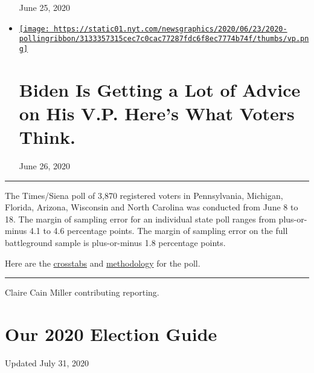 \begin{itemize}
  June 25, 2020
\item
  \href{https://www.nytimes.com/2020/06/26/us/politics/biden-vice-president-voters.html}{\texttt{[image: https://static01.nyt.com/newsgraphics/2020/06/23/2020-pollingribbon/3133357315cec7c0cac77287fdc6f8ec7774b74f/thumbs/vp.png]}}

  \href{https://www.nytimes.com/2020/06/26/us/politics/biden-vice-president-voters.html}{}

  \hypertarget{biden-is-getting-a-lot-of-advice-on-his-vp-heres-what-voters-think}{%
  \section{Biden Is Getting a Lot of Advice on His V.P. Here's What
  Voters
  Think.}\label{biden-is-getting-a-lot-of-advice-on-his-vp-heres-what-voters-think}}

  June 26, 2020
\end{itemize}

\begin{center}\rule{0.5\linewidth}{\linethickness}\end{center}

The Times/Siena poll of 3,870 registered voters in Pennsylvania,
Michigan, Florida, Arizona, Wisconsin and North Carolina was conducted
from June 8 to 18. The margin of sampling error for an individual state
poll ranges from plus-or-minus 4.1 to 4.6 percentage points. The margin
of sampling error on the full battleground sample is plus-or-minus 1.8
percentage points.

Here are the
\href{https://int.nyt.com/data/documenttools/battleground-0625/6ca076db1919b722/full.pdf}{crosstabs}
and
\href{https://int.nyt.com/data/documenttools/nyt-siena-poll-methodology-june-2020/f6f533b4d07f4cbe/full.pdf}{methodology}
for the poll.

\begin{center}\rule{0.5\linewidth}{\linethickness}\end{center}

Claire Cain Miller contributing reporting.

\hypertarget{our-2020-election-guide}{%
\section{Our 2020 Election Guide}\label{our-2020-election-guide}}

Updated July 31, 2020

